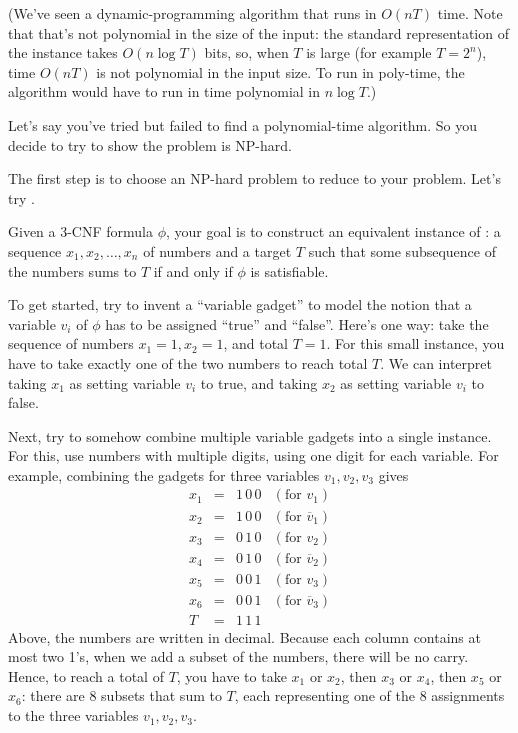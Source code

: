 \documentclass[11pt]{article}
\begin{document}
(We've seen a dynamic-programming algorithm that runs in $O(n T)$ time.
Note that that's not polynomial in the size of the input:
the standard representation of the instance takes $O(n\log T)$ bits,
so, when $T$ is large (for example $T=2^n$),
time $O(n T)$ is not polynomial in the input size.
To run in poly-time, the algorithm would have to run
in time polynomial in $n \log T$.)

Let's say you've tried but failed to find a polynomial-time algorithm.
So you decide to try to show the problem is NP-hard.

The first step is to choose an NP-hard problem to reduce to your problem.
Let's try .

Given a 3-CNF formula $\phi$,
your goal is to construct an equivalent instance of :
a sequence $x_1, x_2,\ldots, x_n$ of numbers and a target $T$
such that some subsequence of the numbers
sums to $T$ if and only if $\phi$ is satisfiable.

To get started, try to invent a ``variable gadget''
to model the notion that a variable $v_i$ of $\phi$ has to be assigned ``true'' and ``false''.
Here's one way:
take the sequence of numbers $x_1=1, x_2=1$, and total $T=1$.
For this small instance, you have to take exactly one of the two numbers to reach total $T$.
We can interpret taking $x_1$ as setting variable $v_i$ to true,
and taking $x_2$ as setting variable $v_i$ to false.

Next, try to somehow combine multiple variable gadgets into a single instance.
For this, use numbers with multiple digits, using one digit for each variable.
For example, combining the gadgets for three variables $v_1, v_2, v_3$
gives
\[\begin{array}{llll}
  x_1 &=& 1\, 0\, 0 & (\text{for } v_1)\\
  x_2 &=& 1\, 0\, 0 & (\text{for } \overline v_1)\\
  x_3 &=& 0\, 1\, 0 & (\text{for } v_2)\\
  x_4 &=& 0\, 1\, 0 & (\text{for } \overline v_2)\\
  x_5 &=& 0\, 0\, 1 & (\text{for } v_3)\\
  x_6 &=& 0\, 0\, 1 & (\text{for } \overline v_3)\\\hline
  T & = & 1\, 1\, 1
\end{array}\]
Above, the numbers are written in decimal.
Because each column contains at most two 1's,
when we add a subset of the numbers, there
will be no carry.  Hence, to reach a total of $T$,
you have to take $x_1$ or $x_2$,
then $x_3$ or $x_4$,
then $x_5$ or $x_6$:
there are 8 subsets that sum to $T$,
each representing one of the 8 assignments to the three variables $v_1, v_2, v_3$.
\end{document}
